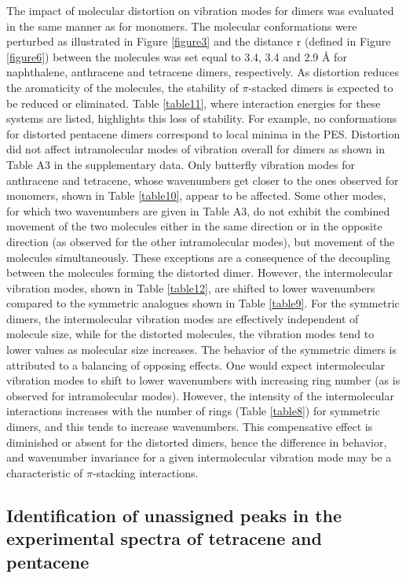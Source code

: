 The impact of molecular distortion on vibration modes for dimers was evaluated in the same manner as for monomers. The molecular conformations were perturbed as illustrated in Figure \ref{figure3}
 and the distance r (defined in Figure \ref{figure6}) between the molecules was set equal to 3.4, 3.4 and 2.9 Å for naphthalene, anthracene and tetracene dimers, respectively.  As distortion reduces the aromaticity of the molecules, the stability of $\pi$-stacked dimers is expected to be reduced or eliminated. Table \ref{table11}, where interaction energies for these systems are listed, highlights this loss of stability. For example, no conformations for distorted pentacene dimers correspond to local minima in the PES. Distortion did not affect intramolecular modes of vibration overall for dimers as shown in Table A3 in the supplementary data. Only butterfly vibration modes for anthracene and tetracene, whose wavenumbers get closer to the ones observed for monomers, shown in Table \ref{table10}, appear to be affected. Some other modes, for which two wavenumbers are given in Table A3, do not exhibit the combined movement of the two molecules either in the same direction or in the opposite direction (as observed for the other intramolecular modes), but movement of the molecules simultaneously. These exceptions are a consequence of the decoupling between the molecules forming the distorted dimer. However, the intermolecular vibration modes, shown in Table \ref{table12}, are shifted to lower wavenumbers compared to the symmetric analogues shown in Table \ref{table9}. For the symmetric dimers, the intermolecular vibration modes are effectively independent of molecule size, while for the distorted molecules, the vibration modes tend to lower values as molecular size increases. 
The behavior of the symmetric dimers is attributed to a balancing of opposing effects. One would expect intermolecular vibration modes to shift to lower wavenumbers with increasing ring number (as is observed for intramolecular modes). However, the intensity of the intermolecular interactions increases with the number of rings (Table \ref{table8}) for symmetric dimers, and this tends to increase wavenumbers. This compensative effect is diminished or absent for the distorted dimers, hence the difference in behavior, and wavenumber invariance for a given intermolecular vibration mode may be a characteristic of $\pi$-stacking interactions. 

\subsection{Identification of unassigned peaks in the experimental spectra of tetracene and pentacene}

